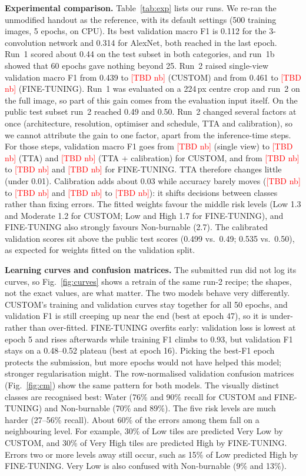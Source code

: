 \documentclass[10pt]{article}
\newcommand{\TBD}[1]{\textcolor{red}{[TBD #1]}}
\newcommand{\CustomValPlain}{\TBD{nb}}
\newcommand{\CustomValTTA}{\TBD{nb}}
\newcommand{\CustomValCal}{\TBD{nb}}
\newcommand{\CustomAccPlain}{\TBD{nb}}
\newcommand{\CustomAccCal}{\TBD{nb}}
\newcommand{\FTValPlain}{\TBD{nb}}
\newcommand{\FTValTTA}{\TBD{nb}}
\newcommand{\FTValCal}{\TBD{nb}}
\newcommand{\FTAccPlain}{\TBD{nb}}
\newcommand{\FTAccCal}{\TBD{nb}}
\begin{document}
\textbf{Experimental comparison.} Table~\ref{tab:exp} lists our runs. We re-ran the unmodified handout as the reference, with its default settings (500 training images, 5 epochs, on CPU). Its best validation macro F1 is 0.112 for the 3-convolution network and 0.314 for AlexNet, both reached in the last epoch. Run~1 scored about 0.44 on the test subset in both categories, and run~1b showed that 60 epochs gave nothing beyond 25. Run~2 raised single-view validation macro F1 from 0.439 to \CustomValPlain{} (CUSTOM) and from 0.461 to \FTValPlain{} (FINE-TUNING). Run~1 was evaluated on a 224\,px centre crop and run~2 on the full image, so part of this gain comes from the evaluation input itself. On the public test subset run~2 reached 0.49 and 0.50. Run~2 changed several factors at once (architecture, resolution, optimiser and schedule, TTA and calibration), so we cannot attribute the gain to one factor, apart from the inference-time steps. For those steps, validation macro F1 goes from \CustomValPlain{} (single view) to \CustomValTTA{} (TTA) and \CustomValCal{} (TTA + calibration) for CUSTOM, and from \FTValPlain{} to \FTValTTA{} and \FTValCal{} for FINE-TUNING. TTA therefore changes little (under 0.01). Calibration adds about 0.03 while accuracy barely moves (\CustomAccPlain{} to \CustomAccCal{} and \FTAccPlain{} to \FTAccCal{}): it shifts decisions between classes rather than fixing errors. The fitted weights favour the middle risk levels (Low 1.3 and Moderate 1.2 for CUSTOM; Low and High 1.7 for FINE-TUNING), and FINE-TUNING also strongly favours Non-burnable (2.7). The calibrated validation scores sit above the public test scores (0.499 vs.\ 0.49; 0.535 vs.\ 0.50), as expected for weights fitted on the validation split.

\textbf{Learning curves and confusion matrices.} The submitted run did not log its curves, so Fig.~\ref{fig:curves} shows a retrain of the same run-2 recipe; the shapes, not the exact values, are what matter. The two models behave very differently. CUSTOM's training and validation curves stay together for all 50 epochs, and validation F1 is still creeping up near the end (best at epoch 47), so it is under- rather than over-fitted. FINE-TUNING overfits early: validation loss is lowest at epoch 5 and rises afterwards while training F1 climbs to 0.93, but validation F1 stays on a 0.48--0.52 plateau (best at epoch 16). Picking the best-F1 epoch protects the submission, but more epochs would not have helped this model; stronger regularisation might. The row-normalised validation confusion matrices (Fig.~\ref{fig:cm}) show the same pattern for both models. The visually distinct classes are recognised best: Water (76\% and 90\% recall for CUSTOM and FINE-TUNING) and Non-burnable (70\% and 89\%). The five risk levels are much harder (27--56\% recall). About 60\% of the errors among them fall on a neighbouring level. For example, 30\% of Low tiles are predicted Very Low by CUSTOM, and 30\% of Very High tiles are predicted High by FINE-TUNING. Errors two or more levels away still occur, such as 15\% of Low predicted High by FINE-TUNING. Very Low is also confused with Non-burnable (9\% and 13\%).
\end{document}
